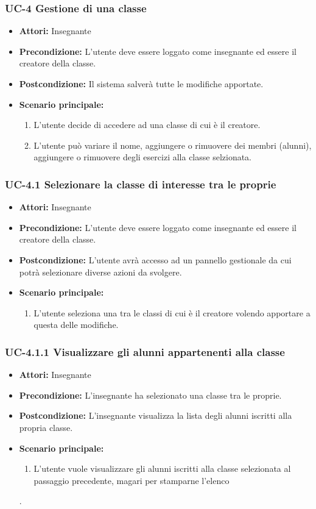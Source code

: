 \subsubsection{UC-4 Gestione di una classe}
\begin{itemize}
		\item \textbf{Attori: } Insegnante
		\item \textbf{Precondizione: }  L'utente deve essere loggato come insegnante ed essere il creatore della classe. 
		\item \textbf{Postcondizione: } Il sistema salverà tutte le modifiche apportate. 
		\item \textbf{Scenario principale: } 
		\begin{enumerate}
			\item L'utente decide di accedere ad una classe di cui è il creatore.
			\item L'utente può variare il nome, aggiungere o rimuovere dei membri (alunni), aggiungere o rimuovere degli esercizi alla classe selzionata.
		\end{enumerate}
	\end{itemize}
	

\subsubsection{UC-4.1 Selezionare la classe di interesse tra le proprie}
	\begin{itemize}
		\item \textbf{Attori: } Insegnante
		\item \textbf{Precondizione: } L'utente deve essere loggato come insegnante ed essere il creatore della classe. 
		\item \textbf{Postcondizione: } L'utente avrà accesso ad un pannello gestionale da cui potrà selezionare diverse azioni da svolgere.
		\item \textbf{Scenario principale: } 
		\begin{enumerate}
			\item L'utente seleziona una tra le classi di cui è il creatore volendo apportare a questa delle modifiche.
		\end{enumerate}
	\end{itemize}
\subsubsection{UC-4.1.1 Visualizzare gli alunni appartenenti alla classe}
\begin{itemize}
		\item \textbf{Attori: } Insegnante
		\item \textbf{Precondizione: }  L'insegnante ha selezionato una classe tra le proprie.
		\item \textbf{Postcondizione: } L'insegnante visualizza la lista degli alunni iscritti alla propria classe.
		\item \textbf{Scenario principale: } 
		\begin{enumerate}
			\item L'utente vuole visualizzare gli alunni iscritti alla classe selezionata al passaggio precedente, magari per stamparne l'elenco
		\end{enumerate}.
	\end{itemize}
